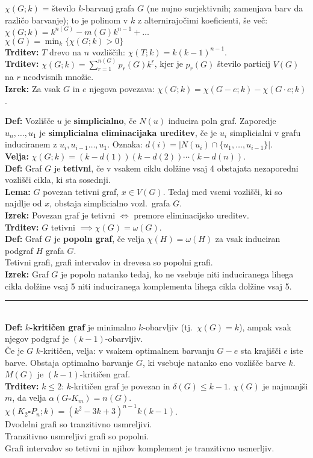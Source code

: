 \documentclass[a4paper,10pt]{article}
\theoremstyle{definition}
\let\oldtextbf\textbf
\renewcommand{\textbf}[1]{\oldtextbf{\boldmath #1}}
\newcommand{\rlsep}{\rule{0.5 \textwidth}{.1pt}}
\begin{document}
\textbf{$\chi(G; k)$} = število $k$-barvanj grafa $G$ (ne nujno surjektivnih; zamenjava barv da različo barvanje); to je polinom v $k$ z alternirajočimi koeficienti, še več: $\chi(G; k) = k^{n(G)} - m(G) k^{n-1} + \ldots$\\
$\chi(G) = \min_k \{\chi(G; k) > 0\}$\\
\textbf{Trditev:} $T$ drevo na $n$ vozliščih: $\chi(T; k) = k (k-1)^{n-1}$.\\
\textbf{Trditev:} $\chi(G; k) = \sum_{r = 1}^{n(G)} p_r(G) k^{\underline{r}}$, kjer je $p_r(G)$ število particij $V(G)$ na $r$ neodvisnih množic.\\
\textbf{Izrek:} Za vsak $G$ in $e$ njegova povezava: $\chi(G; k) = \chi(G-e; k) - \chi(G \cdot e; k)$.

\textbf{Def:} Vozlišče $u$ je \textbf{simplicialno}, če $N(u)$ inducira poln graf. Zaporedje $u_n, \ldots, u_1$ je \textbf{simplicialna eliminacijaka ureditev}, če je $u_i$ simplicialni v grafu induciranem z $u_i, u_{i-1} \ldots, u_1$. Oznaka: $d(i) = |N(u_i) \cap \{u_1, \ldots, u_{i-1}\}|$.\\
\textbf{Velja:} $\chi(G; k) = (k - d(1)) (k-d(2)) \cdots (k-d(n))$.\\
\textbf{Def:} Graf $G$ je \textbf{tetivni}, če v vsakem ciklu dolžine vsaj 4 obstajata nezaporedni vozlišči cikla, ki sta sosednji.\\
\textbf{Lema:} $G$ povezan tetivni graf, $x \in V(G)$. Tedaj med vsemi vozlišči, ki so najdlje od $x$, obstaja simplicialno vozl.\ grafa $G$.\\
\textbf{Izrek:} Povezan graf je tetivni $\iff$ premore eliminacijsko ureditev.\\
\textbf{Trditev:} $G$ tetivni $\implies \chi(G) = \omega(G)$.\\
\textbf{Def:} Graf $G$ je \textbf{popoln graf}, če velja $\chi(H) = \omega(H)$ za vsak induciran podgraf $H$ grafa $G$.\\
Tetivni grafi, grafi intervalov in drevesa so popolni grafi.\\
\textbf{Izrek:} Graf $G$ je popoln natanko tedaj, ko ne vsebuje niti induciranega lihega cikla dolžine vsaj 5 niti induciranega komplementa lihega cikla dolžine vsaj 5.\\
\rlsep\\
\textbf{Def:} \textbf{$k$-kritičen graf} je minimalno $k$-obarvljiv (tj.\ $\chi(G) = k $), ampak vsak njegov podgraf je $(k-1)$-obarvljiv.\\
Če je $G$ $k$-kritičen, velja: v vsakem optimalnem barvanju $G - e$ sta krajišči $e$ iste barve. Obstaja optimalno barvanje $G$, ki vsebuje natanko eno vozlišče barve $k$. $M(G)$ je $(k-1)$-kritičen graf.\\
\textbf{Trditev:} $k \leq 2$: $k$-kritičen graf je povezan in $\delta(G) \leq k-1$.
$\chi(G)$ je najmanjši $m$, da velja $\alpha(G \square K_m) = n(G)$.\\
$\chi(K_2 \square P_n; k) = (k^2 - 3 k + 3)^{n-1} k (k-1)$.\\
Dvodelni grafi so tranzitivno usmreljivi.\\
Tranzitivno usmreljivi grafi so popolni.\\
Grafi intervalov so tetivni in njihov komplement je tranzitivno usmerljiv.
\end{document}
